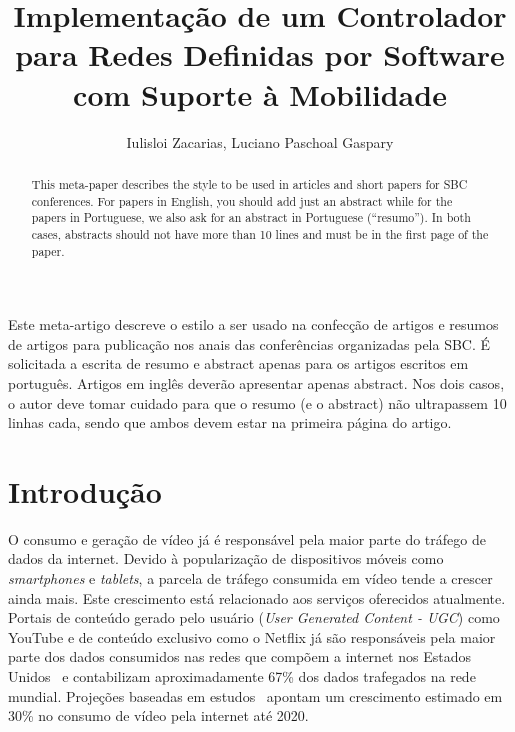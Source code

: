 \documentclass[12pt]{article}
\title{Implementação de um Controlador para Redes Definidas por Software com Suporte à Mobilidade}
\author{Iulisloi Zacarias, Luciano Paschoal Gaspary}
\begin{document}
 

\maketitle

\begin{abstract}
  This meta-paper describes the style to be used in articles and short papers
  for SBC conferences. For papers in English, you should add just an abstract
  while for the papers in Portuguese, we also ask for an abstract in
  Portuguese (``resumo''). In both cases, abstracts should not have more than
  10 lines and must be in the first page of the paper.
\end{abstract}
     
\begin{resumo} 
  Este meta-artigo descreve o estilo a ser usado na confecção de artigos e
  resumos de artigos para publicação nos anais das conferências organizadas
  pela SBC. É solicitada a escrita de resumo e abstract apenas para os artigos
  escritos em português. Artigos em inglês deverão apresentar apenas abstract.
  Nos dois casos, o autor deve tomar cuidado para que o resumo (e o abstract)
  não ultrapassem 10 linhas cada, sendo que ambos devem estar na primeira
  página do artigo.
\end{resumo}


\section{Introdução}

O consumo e geração de vídeo já é responsável pela maior parte do 
tráfego de dados da internet. Devido à popularização de 
dispositivos móveis como \emph{smartphones} e \emph{tablets}, a 
parcela de tráfego consumida em vídeo tende a crescer ainda mais. 
Este crescimento está relacionado aos serviços oferecidos 
atualmente. Portais de conteúdo gerado pelo usuário (\emph{User 
Generated Content - UGC}) como YouTube e de conteúdo exclusivo 
como o Netflix já são responsáveis pela maior parte dos 
dados consumidos nas redes que compõem a internet nos Estados 
Unidos~\cite{narayanan2014} e contabilizam aproximadamente 67\% dos 
dados trafegados na rede mundial. Projeções baseadas em 
estudos~\cite{cisco2016} apontam um crescimento estimado em 30\% no 
consumo de vídeo pela internet até 2020.
\end{document}
